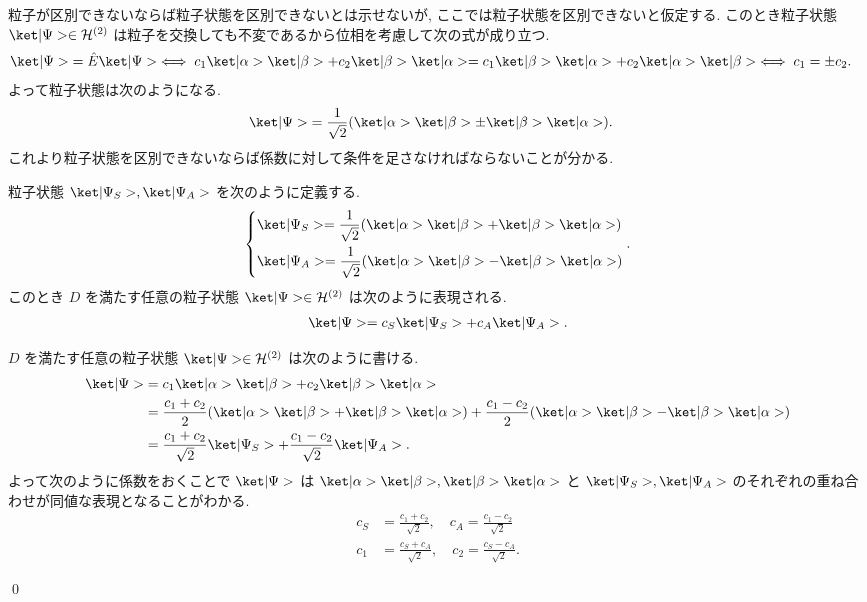\documentclass[uplatex,dvipdfmx,a4paper,11pt]{jlreq}
\makeatletter
\newcommand{\HH}{\mathcal{H}}
\numberwithin{equation}{section}
\theoremstyle{definition}
\renewenvironment{proof}[1][\proofname]{\par
  \normalfont
  \topsep6\p@\@plus6\p@ \trivlist
  \item[\hskip\labelsep{\bfseries #1}\@addpunct{\bfseries}]\ignorespaces\quad\par
}{
  \qed\endtrivlist\@endpefalse
}
\renewcommand\proofname{証明}
\makeatother
\begin{document}
\begin{problem}[Q21-1(i)]
粒子が区別できないならば粒子状態を区別できないとは示せないが, ここでは粒子状態を区別できないと仮定する. このとき粒子状態 $\ket|\Psi>\in\HH^{(2)}$ は粒子を交換しても不変であるから位相を考慮して次の式が成り立つ.
\begin{align}
  \ket|\Psi> & = \hat{E}\ket|\Psi> \iff c_1\ket|\alpha>\ket|\beta> + c_2\ket|\beta>\ket|\alpha> = c_1\ket|\beta>\ket|\alpha> + c_2\ket|\alpha>\ket|\beta> \iff c_1 = \pm c_2.
\end{align}
よって粒子状態は次のようになる.
\begin{align}
  \ket|\Psi> & = \frac{1}{\sqrt{2}}(\ket|\alpha>\ket|\beta> \pm \ket|\beta>\ket|\alpha>).
\end{align}
これより粒子状態を区別できないならば係数に対して条件を足さなければならないことが分かる.
\label{Q21-1(i)}
\end{problem}

\begin{proposition}[Q21-1(ii)]
  粒子状態 $\ket|\Psi_S>, \ket|\Psi_A>$ を次のように定義する.
  \begin{align}
    \begin{dcases}
      \ket|\Psi_S> = \frac{1}{\sqrt{2}}(\ket|\alpha>\ket|\beta> + \ket|\beta>\ket|\alpha>) \\
      \ket|\Psi_A> = \frac{1}{\sqrt{2}}(\ket|\alpha>\ket|\beta> - \ket|\beta>\ket|\alpha>)
    \end{dcases}.
  \end{align}
  このとき $D$ を満たす任意の粒子状態 $\ket|\Psi>\in\HH^{(2)}$ は次のように表現される.
  \begin{align}
    \ket|\Psi> = c_S\ket|\Psi_S> + c_A\ket|\Psi_A>.
  \end{align}
\end{proposition}
\begin{proof}
  $D$ を満たす任意の粒子状態 $\ket|\Psi>\in\HH^{(2)}$ は次のように書ける.
  \begin{align}
    \ket|\Psi> & = c_1\ket|\alpha>\ket|\beta> + c_2\ket|\beta>\ket|\alpha>                                                                                         \\
               & = \frac{c_1 + c_2}{2}(\ket|\alpha>\ket|\beta> + \ket|\beta>\ket|\alpha>) + \frac{c_1 - c_2}{2}(\ket|\alpha>\ket|\beta> - \ket|\beta>\ket|\alpha>) \\
               & = \frac{c_1 + c_2}{\sqrt{2}}\ket|\Psi_S> + \frac{c_1 - c_2}{\sqrt{2}}\ket|\Psi_A>.
  \end{align}
  よって次のように係数をおくことで $\ket|\Psi>$ は $\ket|\alpha>\ket|\beta>, \ket|\beta>\ket|\alpha>$ と $\ket|\Psi_S>, \ket|\Psi_A>$ のそれぞれの重ね合わせが同値な表現となることがわかる.
  \begin{align}
    c_S & = \frac{c_1 + c_2}{\sqrt{2}}, \quad c_A = \frac{c_1 - c_2}{\sqrt{2}}  \\
    c_1 & = \frac{c_S + c_A}{\sqrt{2}}, \quad c_2 = \frac{c_S - c_A}{\sqrt{2}}.
  \end{align}
\end{proof}
\end{document}
